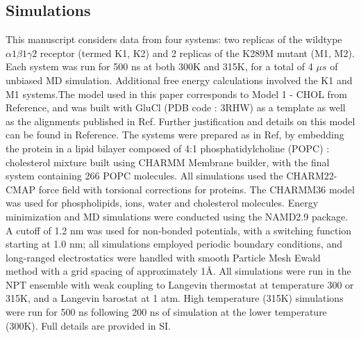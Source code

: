 \documentclass[9pt,twocolumn,twoside,lineno]{pnas-new}
\begin{document}
\subsection*{Simulations}
This manuscript considers data from four systems: two replicas of the wildtype $\alpha1\beta1\gamma2$ receptor (termed K1, K2) and 2 replicas of the K289M mutant (M1, M2). Each system was run for 500 ns at both 300K and 315K, for a total of 4 $\mu s$ of unbiased MD simulation. Additional free energy calculations involved the K1 and M1 systems.The model used in this paper corresponds to Model 1 - CHOL from Reference\cite{Henin2014}, and was built with GluCl (PDB code : 3RHW) as a template as well as the alignments published in Ref\cite{Hibbs2011}. Further justification and details on this model can be found in Reference\cite{Henin2014}. The systems were prepared as in Ref\cite{Henin2014}, by embedding the protein in a lipid bilayer composed of 4:1 phosphatidylcholine (POPC) : cholesterol mixture built using CHARMM Membrane builder, with the final system containing 266 POPC molecules. %
All simulations used the CHARM22-CMAP\cite{MacKerell1998a} force field with torsional corrections for proteins. The CHARMM36 model\cite{Klauda2010,Pitman2004} was used for phospholipids, ions, water and cholesterol molecules. Energy minimization and MD simulations were conducted using the NAMD2.9 package\cite{Phillips2005a}.  A cutoff of 1.2 nm was used for non-bonded potentials, with a switching function starting at 1.0 nm; all simulations employed periodic boundary conditions, and long-ranged electrostatics were handled with smooth Particle Mesh Ewald method with a grid spacing of approximately 1\AA. All simulations were run in the NPT ensemble with weak coupling to Langevin thermostat at temperature 300 or 315K, and a Langevin barostat at 1 atm.   High temperature (315K) simulations were run for 500 ns following 200 ns of simulation at the lower temperature (300K).  Full details are provided in SI.



\end{document}
